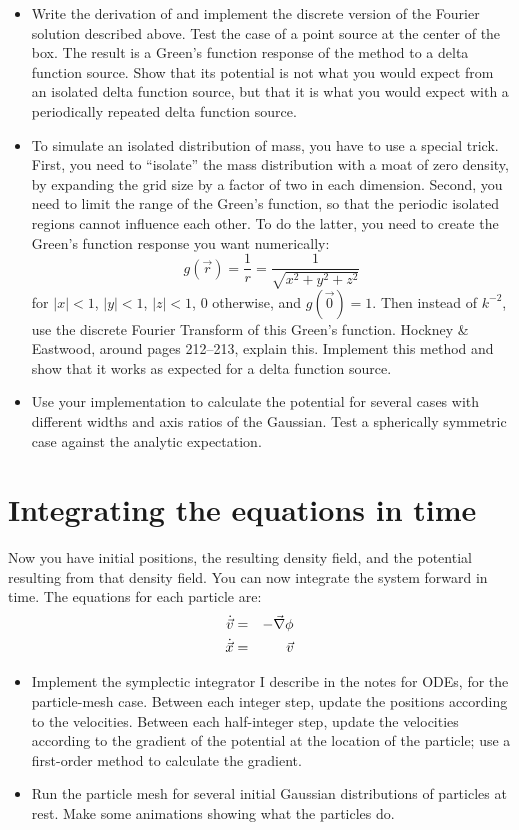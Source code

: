 \documentclass[11pt, preprint]{aastex}
\begin{document}
\begin{itemize}
\item Write the derivation of and implement the discrete version of
  the Fourier solution described above. Test the case of a point
  source at the center of the box. The result is a Green's function
  response of the method to a delta function source. Show that its
  potential is not what you would expect from an isolated delta
  function source, but that it is what you would expect with a
  periodically repeated delta function source.
\item To simulate an isolated distribution of mass, you have to use a
  special trick. First, you need to ``isolate'' the mass distribution
  with a moat of zero density, by expanding the grid size by a factor
  of two in each dimension. Second, you need to limit the range of the
  Green's function, so that the periodic isolated regions cannot
  influence each other. To do the latter, you need to create the
  Green's function response you want numerically:
  \begin{equation}
    g(\vec{r}) = \frac{1}{r} = \frac{1}{\sqrt{x^2 +y^2 + z^2}}
  \end{equation}
  for $|x|<1$, $|y|<1$, $|z|<1$, 0 otherwise, and $g(\vec{0}) =
  1$. Then instead of $k^{-2}$, use the discrete Fourier Transform of
  this Green's function.  Hockney \& Eastwood, around pages 212--213,
  explain this. Implement this method and show that it works as
  expected for a delta function source.
\item Use your implementation to calculate the potential for several
  cases with different widths and axis ratios of the Gaussian. Test
  a spherically symmetric case against the analytic expectation.
\end{itemize}

\section{Integrating the equations in time}

Now you have initial positions, the resulting density field, and the
potential resulting from that density field. You can now integrate the
system forward in time. The equations for each particle are:
\begin{eqnarray}
\dot{\vec{v}} &=& -\vec{\nabla}\phi \cr
\dot{\vec{x}} &=& \vec{v} 
\end{eqnarray}

\begin{itemize}
\item Implement the symplectic integrator I describe in the notes for
  ODEs, for the particle-mesh case. Between each integer step,
  update the positions according to the velocities. Between each
  half-integer step, update the velocities according to the gradient
  of the potential at the location of the particle; use a first-order
  method to calculate the gradient. 
\item Run the particle mesh for several initial Gaussian distributions
  of particles at rest. Make some animations showing what the
  particles do. 
\end{itemize}
\end{document}
